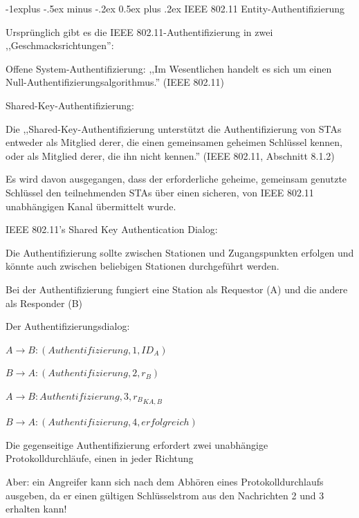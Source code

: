 \documentclass[a4paper]{article}
\makeatletter
\renewcommand{\subsection}{\@startsection{subsection}{2}{0mm}%
 {-1explus -.5ex minus -.2ex}%
 {0.5ex plus .2ex}%
 {\normalfont\normalsize\bfseries}}
\makeatother
\begin{document}
\begin{multicols}{3}
      \subsection{IEEE 802.11 Entity-Authentifizierung}
      \begin{itemize*}
            \item Ursprünglich gibt es die IEEE 802.11-Authentifizierung in zwei ,,Geschmacksrichtungen'':
            \begin{itemize*}
                  \item Offene System-Authentifizierung: ,,Im Wesentlichen handelt es sich um einen Null-Authentifizierungsalgorithmus.'' (IEEE 802.11)
                  \item Shared-Key-Authentifizierung:
                  \begin{itemize*}
                        \item Die ,,Shared-Key-Authentifizierung unterstützt die Authentifizierung von STAs entweder als Mitglied derer, die einen gemeinsamen geheimen Schlüssel kennen, oder als Mitglied derer, die ihn nicht kennen.'' (IEEE 802.11, Abschnitt 8.1.2)
                        \item Es wird davon ausgegangen, dass der erforderliche geheime, gemeinsam genutzte Schlüssel den teilnehmenden STAs über einen sicheren, von IEEE 802.11 unabhängigen Kanal übermittelt wurde.
                  \end{itemize*}
            \end{itemize*}
      \end{itemize*}

      IEEE 802.11's Shared Key Authentication Dialog:
      \begin{itemize*}
            \item Die Authentifizierung sollte zwischen Stationen und Zugangspunkten erfolgen und könnte auch zwischen beliebigen Stationen durchgeführt werden.
            \item Bei der Authentifizierung fungiert eine Station als Requestor (A) und die andere als Responder (B)
            \item Der Authentifizierungsdialog:
            \begin{enumerate*}
                  \item $A \rightarrow B: (Authentifizierung, 1, ID_A)$
                  \item $B \rightarrow A: (Authentifizierung, 2, r_B)$
                  \item $A \rightarrow B: {Authentifizierung, 3, r_B}_{{K}{A,B}}$
                  \item $B \rightarrow A: (Authentifizierung, 4, erfolgreich)$
            \end{enumerate*}
            \item Die gegenseitige Authentifizierung erfordert zwei unabhängige Protokolldurchläufe, einen in jeder Richtung
            \item Aber: ein Angreifer kann sich nach dem Abhören eines Protokolldurchlaufs ausgeben, da er einen gültigen Schlüsselstrom aus den Nachrichten 2 und 3 erhalten kann!
      \end{itemize*}


\end{multicols}
\end{document}
